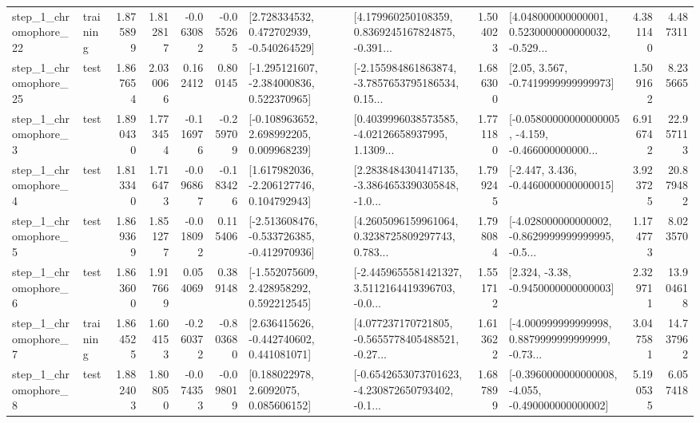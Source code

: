 \begin{tabular}{llrrrrllrlrr}
    step\_1\_chromophore\_22 &  training &      1.875899 &    1.812817 &     -0.063082 & -0.055265 &    [2.728334532, 0.472702939, -0.540264529] &  [4.179960250108359, 0.8369245167824875, -0.391... &       1.504023 &  [4.048000000000001, 0.5230000000000032, -0.529... &            4.381140 &          4.487311 \\
    step\_1\_chromophore\_25 &      test &      1.867654 &    2.030066 &      0.162412 &  0.800145 &   [-1.295121607, -2.384000836, 0.522370965] &  [-2.155984861863874, -3.7857653795186534, 0.15... &       1.686300 &                 [2.05, 3.567, -0.7419999999999973] &            1.509162 &          8.235665 \\
     step\_1\_chromophore\_3 &      test &      1.890430 &    1.773454 &     -0.116976 & -0.259709 &    [-0.108963652, 2.698992205, 0.009968239] &  [0.4039996038573585, -4.02126658937995, 1.1309... &       1.771180 &  [-0.05800000000000005, -4.159, -0.466000000000... &            6.916742 &         22.957113 \\
     step\_1\_chromophore\_4 &      test &      1.813340 &    1.716473 &     -0.096867 & -0.183426 &    [1.617982036, -2.206127746, 0.104792943] &  [2.2838484304147135, -3.3864653390305848, -1.0... &       1.799245 &               [-2.447, 3.436, -0.4460000000000015] &            3.923725 &         20.879482 \\
     step\_1\_chromophore\_5 &      test &      1.869369 &    1.851277 &     -0.018092 &  0.115406 &  [-2.513608476, -0.533726385, -0.412970936] &  [4.2605096159961064, 0.3238725809297743, 0.783... &       1.798084 &  [-4.028000000000002, -0.8629999999999995, -0.5... &            1.174773 &          8.023570 \\
     step\_1\_chromophore\_6 &      test &      1.863600 &    1.917669 &      0.054069 &  0.389148 &    [-1.552075609, 2.428958292, 0.592212545] &  [-2.4459655581421327, 3.5112164419396703, -0.0... &       1.551712 &                [2.324, -3.38, -0.9450000000000003] &            2.329711 &         13.904618 \\
     step\_1\_chromophore\_7 &  training &      1.864525 &    1.604153 &     -0.260372 & -0.803680 &    [2.636415626, -0.442740602, 0.441081071] &  [4.077237170721805, -0.5655778405488521, -0.27... &       1.613622 &  [-4.000999999999998, 0.8879999999999999, -0.73... &            3.047581 &         14.737962 \\
     step\_1\_chromophore\_8 &      test &      1.882403 &    1.808050 &     -0.074353 & -0.098019 &       [0.188022978, 2.6092075, 0.085606152] &  [-0.6542653073701623, -4.230872650793402, -0.1... &       1.687899 &  [-0.3960000000000008, -4.055, -0.490000000000002] &            5.190535 &          6.057418 \\

\end{tabular}
